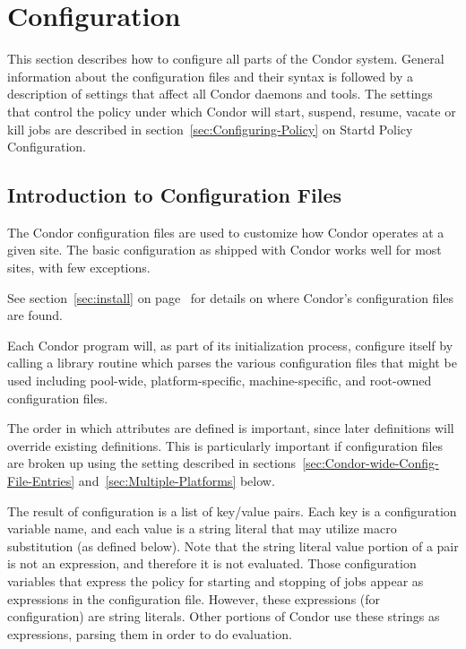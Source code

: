 \section{\label{sec:Configuring-Condor}Configuration}


This section describes how to configure all parts of the Condor
system.  General information about the configuration
files and their syntax is followed by a description of
settings that affect all
Condor daemons and tools.
The 
settings that control the policy under which Condor will start,
suspend, resume, vacate or kill jobs
are described in 
section~\ref{sec:Configuring-Policy} on Startd Policy Configuration. 

\subsection{\label{sec:Intro-to-Config-Files}Introduction to
  Configuration Files} 

The Condor configuration files are used to customize how Condor
operates at a given site.  The basic configuration as shipped with
Condor works well for most sites, with few exceptions.

See section~\ref{sec:install} on
page~\pageref{sec:install}
for details on where
Condor's configuration files are found.

Each Condor program will, as part of its initialization process,
configure itself by calling a library routine which parses the
various configuration files that might be used including pool-wide,
platform-specific, machine-specific, and root-owned configuration files.


The order in which attributes are defined is important, since later
definitions will override existing definitions.
This is particularly important if configuration files are broken up
using the  setting described in
sections~\ref{sec:Condor-wide-Config-File-Entries}
and~\ref{sec:Multiple-Platforms} below.

The result of configuration is a list of key/value pairs.
Each key is a configuration variable name,
and each value is a string literal
that may utilize macro substitution (as defined below).
Note that the string literal value portion of a pair is not an expression,
and therefore it is not evaluated.
Those configuration variables that express the policy for
starting and stopping of jobs appear as expressions in the
configuration file.
However, these expressions (for configuration) are string literals.
Other portions of Condor use these strings as expressions,
parsing them in order to do evaluation.



